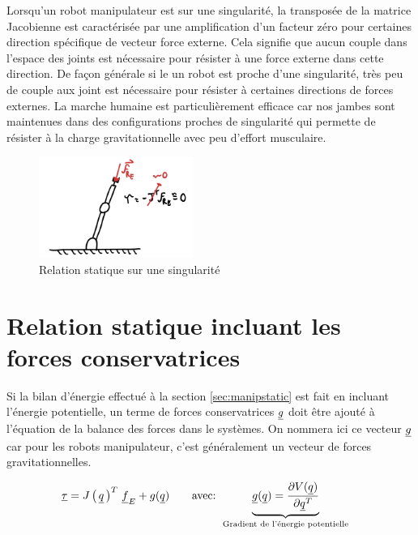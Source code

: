 Lorsqu'un robot manipulateur est sur une singularité, la transposée de la matrice Jacobienne est caractérisée par une amplification d'un facteur zéro pour certaines direction spécifique de vecteur force externe. Cela signifie que aucun couple dans l'espace des joints est nécessaire pour résister à une force externe dans cette direction. De façon générale si le un robot est proche d'une singularité, très peu de couple aux joint est nécessaire pour résister à certaines directions de forces externes. La marche humaine est particulièrement efficace car nos jambes sont maintenues dans des configurations proches de singularité qui permette de résister à la charge gravitationnelle avec peu d'effort musculaire. 
\begin{figure}[H]
	\centering
		\includegraphics[width=0.45\textwidth]{fig/externalforcesingularity.jpg}
	\caption{Relation statique sur une singularité}
	\label{fig:externalforcesingularity}
\end{figure}


\section{Relation statique incluant les forces conservatrices}
\label{sec:manipstaticconservative}

Si la bilan d'énergie effectué à la section \ref{sec:manipstatic} est fait en incluant l'énergie potentielle, un terme de forces conservatrices $\underline{g}$ doit être ajouté à l'équation de la balance des forces dans le systèmes. On nommera ici ce vecteur $\underline{g}$ car pour les robots manipulateur, c'est généralement un vecteur de forces gravitationnelles. 

\begin{align}
\underline{\tau} &= J\left( \, \underline{q} \, \right)^T \, \underline{f}_E +  g( \underline{q} )
\quad \quad \text{avec:  }
\underbrace{ \underline{g} ( \underline{q} ) = 
\frac{ \partial V(\underline{q} ) }{\partial \underline{q}^T } 
}_{\text{Gradient de l'énergie potentielle}}
\label{eq:staticgravity}
\end{align}

